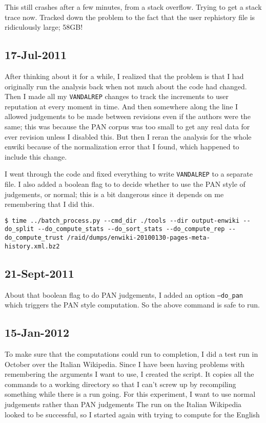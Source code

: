 This still crashes after a few minutes, from a stack overflow.
Trying to get a stack trace now.
Tracked down the problem to the fact that the user rephistory file
is ridiculously large; 58GB!

\subsection{17-Jul-2011}

After thinking about it for a while, I realized that the problem
is that I had originally run the analysis back when not much about
the code had changed.
Then I made all my \texttt{VANDALREP} changes to track the increments
to user reputation at every moment in time.
And then somewhere along the line I allowed judgements to be made between
revisions even if the authors were the same; this was because
the PAN corpus was too small to get any real data for ever revision
unless I disabled this.
But then I reran the analysis for the whole enwiki because of
the normalization error that I found, which happened to include this
change.

I went through the code and fixed everything to write
\texttt{VANDALREP} to a separate file.
I also added a boolean flag to 
to decide whether to use the PAN style of judgements, or normal;
this is a bit dangerous since it depends on me remembering that
I did this.

\begin{verbatim}
$ time ../batch_process.py --cmd_dir ./tools --dir output-enwiki --do_split --do_compute_stats --do_sort_stats --do_compute_rep --do_compute_trust /raid/dumps/enwiki-20100130-pages-meta-history.xml.bz2
\end{verbatim}

\subsection{21-Sept-2011}

About that boolean flag to do PAN judgements, I added an option
\texttt{--do\_pan} which triggers the PAN style computation.
So the above command is safe to run.

\subsection{15-Jan-2012}

To make sure that the computations could run to completion, I did a test
run in October over the Italian Wikipedia.
Since I have been having problems with remembering the arguments I want
to use, I created the 
script.
It copies all the commands to a working directory so that I can't screw
up by recompiling something while there is a run going.
For this experiment, I want to use normal judgements rather than PAN
judgements
The run on the Italian Wikipedia looked to be successful, so I started
again with trying to compute for the English

